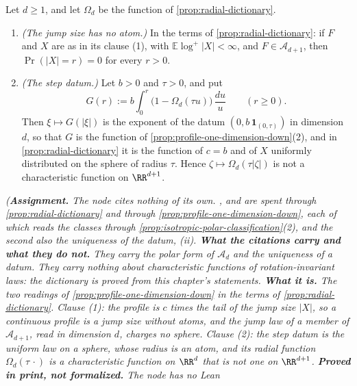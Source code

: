 \begin{theorem}
\label{cor:dictionary-filtration}
Let $d \ge 1$, and let $\Omega_d$ be the function of \ref{prop:radial-dictionary}.
\begin{enumerate}
\item \emph{(The jump size has no atom.)} In the terms of
\ref{prop:radial-dictionary}: if $F$ and $X$ are as in its clause (1), with
$\mathbb{E}\log^+|X| < \infty$, and $F \in \mathcal{A}_{d+1}$, then $\Pr(|X| = r) = 0$ for every
$r > 0$.
\item \emph{(The step datum.)} Let $b > 0$ and $\tau > 0$, and put
\[
  G(r) := b\int_0^r \bigl(1 - \Omega_d(\tau u)\bigr)\,\frac{du}{u} \qquad (r \ge 0) .
\]
Then $\xi \mapsto G(|\xi|)$ is the exponent of the datum $(0, b\,\mathbf 1_{(0,\tau)})$ in
dimension $d$, so that $G$ is the function of \ref{prop:profile-one-dimension-down}(2), and in
\ref{prop:radial-dictionary} it is the function of $c = b$ and of $X$ uniformly distributed on
the sphere of radius $\tau$. Hence $\zeta \mapsto \Omega_d(\tau|\zeta|)$ is not a characteristic
function on $\RR^{d+1}$.
\end{enumerate}
\statusA\quad{}\quad{}\quad{}\quad\emph{(\textbf{Assignment.} The node
cites nothing of its own. ,  and  are spent through
\ref{prop:radial-dictionary} and through \ref{prop:profile-one-dimension-down}, each of which
reads the classes through \ref{prop:isotropic-polar-classification}(2), and the second also the
uniqueness of the datum, (ii). \textbf{What the citations carry and what they do
not.} They carry the polar form of $\mathcal{A}_d$ and the uniqueness of a datum. They carry
nothing about characteristic functions of rotation-invariant laws: the dictionary is proved from
this chapter's statements. \textbf{What it is.} The two readings of
\ref{prop:profile-one-dimension-down} in the terms of \ref{prop:radial-dictionary}. Clause (1):
the profile is $c$ times the tail of the jump size $|X|$, so a continuous profile is a jump size
without atoms, and the jump law of a member of $\mathcal{A}_{d+1}$, read in dimension $d$,
charges no sphere. Clause (2): the step datum is the uniform law on a sphere, whose radius is an
atom, and its radial function $\Omega_d(\tau\,\cdot)$ is a characteristic function on $\RR^d$
that is not one on $\RR^{d+1}$. \textbf{Proved in print, not formalized.} The node has no Lean
}
\end{theorem}
